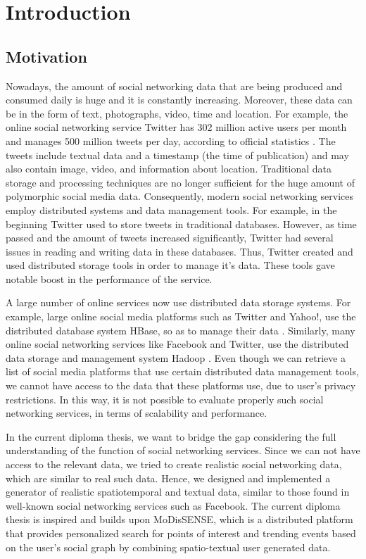 \setcounter{chapter}{0}

\chapter{Introduction}

\setcounter{chapter}{1}

\section{Motivation}

Nowadays, the amount of social networking data that are being produced and consumed daily is huge and it is constantly increasing.
Moreover, these data can be in the form of text, photographs, video, time and location. For example, the online social networking service Twitter 
has 302 million active users per month and manages 500 million tweets per day, according to official statistics \cite {1}. 
The tweets include textual data and a timestamp (the time of publication) and may also contain
image, video, and information about location. Traditional data storage and processing techniques are no longer sufficient for the huge amount of polymorphic 
social media data. Consequently, modern social networking services
employ distributed systems and data management tools. For example, in the beginning Twitter \cite {2} used to 
store tweets in traditional databases. However, as time passed and the amount of tweets increased significantly, Twitter had several issues in 
reading and writing data in these databases. Thus, Twitter created and used distributed storage tools in order to manage it's data. 
These tools gave notable boost in the performance of the service.

A large number of online services now use distributed data storage systems. For example, large online social media platforms 
such as Twitter and Yahoo!, use the distributed database system HBase, so as to manage their data \cite {4}. 
Similarly, many online social networking services like Facebook and Twitter,
use the distributed data storage and management system Hadoop \cite {6}. 
Even though we can retrieve a list of social media platforms that use certain distributed data management tools, 
we cannot have access to the data that these platforms use, due to user's privacy restrictions. 
In this way, it is not possible to 
evaluate properly such social networking services, in terms of scalability and performance.

In the current diploma thesis, we want to bridge the gap considering the full understanding of the function of social networking services.
Since we can not have access to the relevant data, we tried to create realistic social networking data, which are similar to real such data.
Hence, we designed and implemented a generator of realistic spatiotemporal and textual data, similar to 
those found in well-known social networking services such as Facebook. The current diploma thesis is inspired and builds upon MoDisSENSE, which is a 
distributed platform that provides personalized search for points of interest and trending events based on the user’s social graph by combining spatio-textual 
user generated data.\cite{29}

